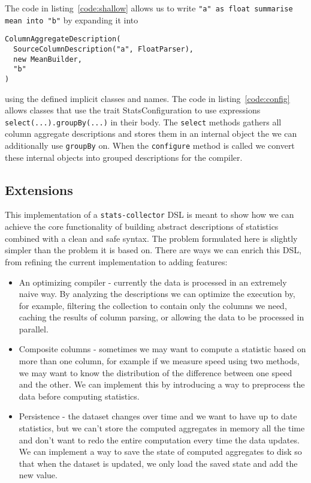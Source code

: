 The code in listing~\ref{code:shallow} allows us to write \texttt{"a" as float summarise mean into "b"} by expanding it into 
\begin{verbatim}
ColumnAggregateDescription(
  SourceColumnDescription("a", FloatParser),
  new MeanBuilder,
  "b"
)
\end{verbatim}
using the defined implicit classes and names.
The code in listing~\ref{code:config} allows classes that use the trait StatsConfiguration to use expressions \texttt{select(...).groupBy(...)} in their body.
The \texttt{select} methods gathers all column aggregate descriptions and stores them in an internal object the we can additionally use \texttt{groupBy} on.
When the \texttt{configure} method is called we convert these internal objects into grouped descriptions for the compiler.

\subsection{Extensions}

This implementation of a \texttt{stats-collector} DSL is meant to show how we can achieve the core functionality of building abstract descriptions of statistics combined with a clean and safe syntax.
The problem formulated here is slightly simpler than the problem it is based on.
There are ways we can enrich this DSL, from refining the current implementation to adding features:
\begin{itemize}
	\item An optimizing compiler - currently the data is processed in an extremely naive way.
By analyzing the descriptions we can optimize the execution by, for example, filtering the collection to contain only the columns we need, caching the results of column parsing, or allowing the data to be processed in parallel.
  \item Composite columns - sometimes we may want to compute a statistic based on more than one column, for example if we measure speed using two methods, we may want to know the distribution of the difference between one speed and the other.
We can implement this by introducing a way to preprocess the data before computing statistics.
  \item Persistence - the dataset changes over time and we want to have up to date statistics, but we can't store the computed aggregates in memory all the time and don't want to redo the entire computation every time the data updates.
We can implement a way to save the state of computed aggregates to disk so that when the dataset is updated, we only load the saved state and add the new value.
\end{itemize}


